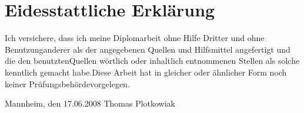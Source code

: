 \chapter*{Eidesstattliche Erkl\"{a}rung}\thispagestyle{empty}Ich versichere, dass ich meine Diplomarbeit ohne Hilfe Dritter und ohne Benutzunganderer als der angegebenen Quellen und Hilfsmittel angefertigt und die den benutztenQuellen w\"{o}rtlich oder inhaltlich entnommenen Stellen als solche kenntlich gemacht habe.Diese Arbeit hat in gleicher oder \"{a}hnlicher Form noch keiner Pr\"{u}fungsbeh\"{o}rdevorgelegen.\bigskip\raggedright{Mannheim, den 17.06.2008} \bigskip \bigskip \bigskip Thomas Plotkowiak